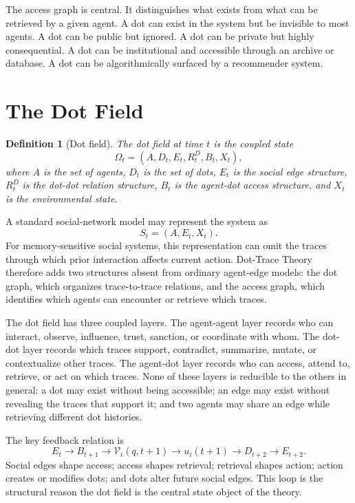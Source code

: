 \documentclass[11pt]{article}
\newtheorem{definition}{Definition}
\theoremstyle{remark}
\begin{document}
The access graph is central. It distinguishes what exists from what can
be retrieved by a given agent. A dot can exist in the system but be
invisible to most agents. A dot can be public but ignored. A dot can be
private but highly consequential. A dot can be institutional and
accessible through an archive or database. A dot can be algorithmically
surfaced by a recommender system.

\section{The Dot Field}\label{the-dot-field}

\begin{definition}[Dot field]
The dot field at time $t$ is the coupled state
$$
\Omega_t = (A,D_t,E_t,R_t^D,B_t,X_t),
$$
where $A$ is the set of agents, $D_t$ is the set of dots, $E_t$ is the social edge structure, $R_t^D$ is the dot-dot relation structure, $B_t$ is the agent-dot access structure, and $X_t$ is the environmental state.
\end{definition}

A standard social-network model may represent the system as
\[
S_t=(A,E_t,X_t).
\]
For memory-sensitive social systems, this representation can omit the traces through which prior interaction affects current action. Dot-Trace Theory therefore adds two structures absent from ordinary agent-edge models: the dot graph, which organizes trace-to-trace relations, and the access graph, which identifies which agents can encounter or retrieve which traces.

The dot field has three coupled layers. The agent-agent layer records who can interact, observe, influence, trust, sanction, or coordinate with whom. The dot-dot layer records which traces support, contradict, summarize, mutate, or contextualize other traces. The agent-dot layer records who can access, attend to, retrieve, or act on which traces. None of these layers is reducible to the others in general: a dot may exist without being accessible; an edge may exist without revealing the traces that support it; and two agents may share an edge while retrieving different dot histories.

The key feedback relation is
\[
E_t \rightarrow B_{t+1}\rightarrow \mathcal V_i(q,t+1)\rightarrow u_i(t+1)\rightarrow D_{t+2}\rightarrow E_{t+2}.
\]
Social edges shape access; access shapes retrieval; retrieval shapes action; action creates or modifies dots; and dots alter future social edges. This loop is the structural reason the dot field is the central state object of the theory.
\end{document}
